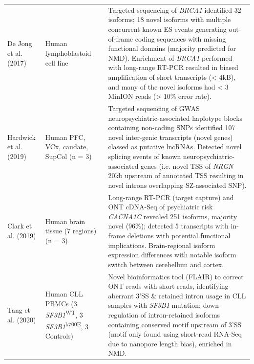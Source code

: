 \begin{landscape}
\begin{longtable}[c]{p{4cm}p{4cm}p{18cm}}
		\centering De Jong et al. (2017)\cite{DeJong2017}  &
		\centering Human lymphoblastoid cell line &
		\tabitem Targeted sequencing of \textit{BRCA1} identified 32 isoforms; 18 novel isoforms with multiple concurrent known ES events generating out-of-frame coding sequences with missing functional domains (majority predicted for NMD). \newline
		\tabitem Enrichment of \textit{BRCA1} performed with long-range RT-PCR resulted in biased amplification of short transcripts (< 4kB), and many of the novel isoforms had < 3 MinION reads (> 10\% error rate).  \\
		\hdashline[0.5pt/5pt]
		
		\centering Hardwick et al. (2019) \cite{Hardwick2019a} &
		\centering Human PFC, VCx, \newline caudate, SupCol (n = 3)  &
		\tabitem Targeted sequencing of GWAS neuropsychiatric-associated haplotype blocks containing non-coding SNPs identified 107 novel inter-genic transcripts (novel genes) classed as putative lncRNAs. \newline 
		\tabitem Detected novel splicing events of known neuropsychiatric-associated genes (i.e. novel TSS of \textit{NRGN} 20kb upstream of annotated TSS resulting in novel introns overlapping SZ-associated SNP).  \\
		
		\centering Clark et al. (2019) \cite{Clark2019} &
		\centering Human brain tissue \newline (7 regions) (n = 3) &
		\tabitem Long-range RT-PCR (target capture) and ONT cDNA-Seq of psychiatric risk \textit{CACNA1C} revealed 251 isoforms, majority novel (96\%); detected 5 transcripts with in-frame deletions with potential functional implications.  \newline 
		\tabitem Brain-regional isoform expression differences with notable isoform switch between cerebellum and cortex.  \\
		\hdashline[0.5pt/5pt]
		
		\centering Tang et al. (2020) \cite{Tang2020} &
		\centering Human CLL PBMCs \newline (3 \textit{SF3B1}\textsuperscript{WT}, 3 \textit{SF3B1}\textsuperscript{k700E}, 3 Controls) &
		\tabitem Novel bioinformatics tool (FLAIR) to correct ONT reads with short reads, identifying aberrant 3'SS \& retained intron usage in CLL samples with \textit{SF3B1} mutation; down-regulation of intron-retained isoforms containing conserved motif upstream of 3'SS (motif only found using short-read RNA-Seq due to nanopore length bias), enriched in NMD.  \\
		

\end{longtable}
\end{landscape}
